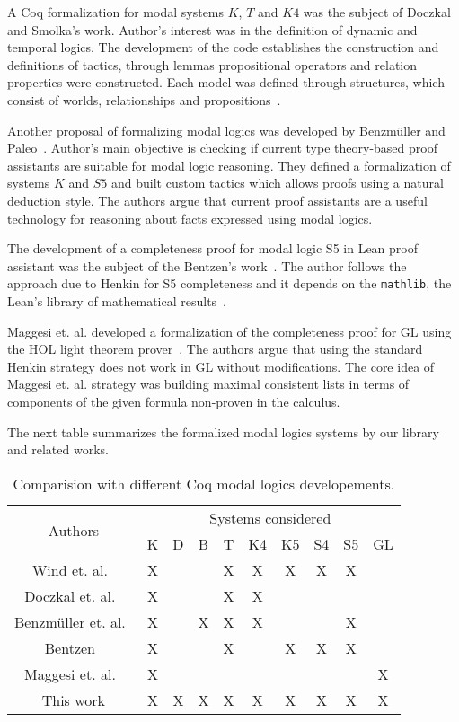 \documentclass[sigconf]{acmart}
\begin{document}
A Coq formalization for modal systems $K$, $T$ and $K4$ was the subject of 
Doczkal and Smolka's work. Author's interest was in the definition of dynamic
and temporal logics. The development of the code establishes the construction
and definitions of tactics, through lemmas propositional operators and relation
properties were constructed. Each model was defined through structures, which
consist of worlds, relationships and propositions~\cite{saarland}.

Another proposal of formalizing modal logics was developed by Benzmüller and
Paleo~\cite{Chris_Bruno}. Author's main objective is checking if current
type theory-based proof assistants are suitable for modal logic reasoning.
They defined a formalization of systems $K$ and $S5$ and built custom tactics
which allows proofs using a natural deduction style.
The authors argue that current proof assistants are a useful technology for
reasoning about facts expressed using modal logics. 

The development of a completeness proof for modal logic S5 in Lean proof
assistant was the subject of the Bentzen's work~\cite{Bentzen2021}. The author
follows the approach due to Henkin for S5 completeness and it depends on
the \texttt{mathlib}, the Lean's library of mathematical results~\cite{mathlib20}. 

Maggesi et. al. developed a formalization of the completeness proof for GL using
the HOL light theorem prover~\cite{Maggesi21}. The authors argue that using the
standard Henkin strategy does not work in GL without modifications. The core idea of
Maggesi et. al. strategy was building maximal consistent lists in terms of
components of the given formula non-proven in the calculus.

The next table summarizes the formalized modal logics systems by our library
and related works.
\vspace{0.5cm} {
  \begin{table}[H]
    \begin{tabular}{|c|c|c|c|c|c|c|c|c|c|}
      \hline
      \multirow{2}{*}{Authors} & \multicolumn{9}{c|}{Systems considered} \\ \cline{2-10} 
                               & K & D & B & T & K4 & K5 & S4 & S5 & GL\\ \hline
      Wind et. al.~\cite{dewind}     & X &   &   & X & X  & X  & X  &  X & \\ \hline
      Doczkal et. al.~\cite{saarland}   & X &   &   & X & X  &    &    &  &  \\ \hline
      Benzmüller et. al.~\cite{Chris_Bruno}& X &   & X & X &  X &    &    & X &  \\ \hline
      Bentzen~\cite{Bentzen2021} & X & & & X & & X & X & X & \\ \hline
      Maggesi et. al.~\cite{Maggesi21} & X & & & & & & & & X \\ \hline
      This work         & X & X & X & X & X  &  X &  X & X  & X \\ \hline
    \end{tabular}
    \centering
    \caption{Comparision with different Coq modal logics developements.}
    \label{tab:comparacao_trabalhos_rel}
  \end{table}
}
\end{document}
